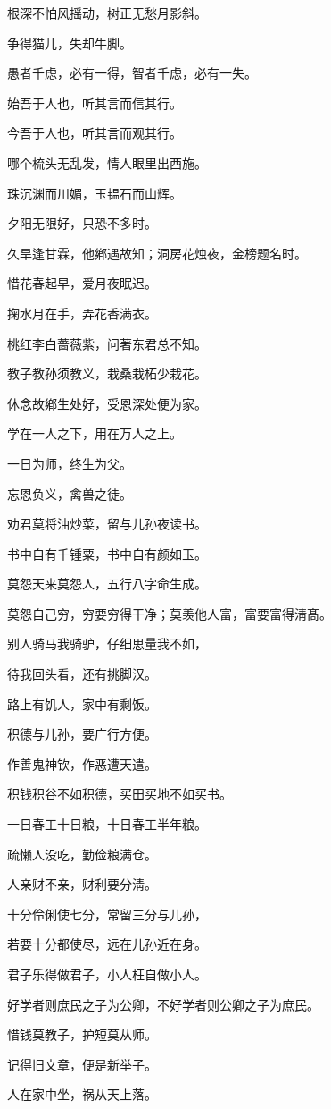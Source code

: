 \documentclass[12pt,oneside]{book}
\begin{document}
根深不怕风摇动，树正无愁月影斜。

争得猫儿，失却牛脚。

愚者千虑，必有一得，智者千虑，必有一失。

始吾于人也，听其言而信其行。

今吾于人也，听其言而观其行。

哪个梳头无乱发，情人眼里出西施。

珠沉渊而川媚，玉韫石而山辉。

夕阳无限好，只恐不多时。

久旱逢甘霖，他鄕遇故知；洞房花烛夜，金榜题名时。

惜花春起早，爱月夜眠迟。

掬水月在手，弄花香满衣。

桃红李白蔷薇紫，问著东君总不知。

教子教孙须教义，栽桑栽柘少栽花。

休念故鄕生处好，受恩深处便为家。

学在一人之下，用在万人之上。

一日为师，终生为父。

忘恩负义，禽兽之徒。

劝君莫将油炒菜，留与儿孙夜读书。

书中自有千锺粟，书中自有颜如玉。

莫怨天来莫怨人，五行八字命生成。

莫怨自己穷，穷要穷得干净；莫羡他人富，富要富得淸髙。

别人骑马我骑驴，仔细思量我不如，

待我回头看，还有挑脚汉。

路上有饥人，家中有剩饭。

积德与儿孙，要广行方便。

作善鬼神钦，作恶遭天遣。

积钱积谷不如积德，买田买地不如买书。

一日春工十日粮，十日春工半年粮。

疏懒人没吃，勤俭粮满仓。

人亲财不亲，财利要分淸。

十分伶俐使七分，常留三分与儿孙，

若要十分都使尽，远在儿孙近在身。

君子乐得做君子，小人枉自做小人。

好学者则庶民之子为公卿，不好学者则公卿之子为庶民。

惜钱莫教子，护短莫从师。

记得旧文章，便是新举子。

人在家中坐，祸从天上落。
\end{document}

